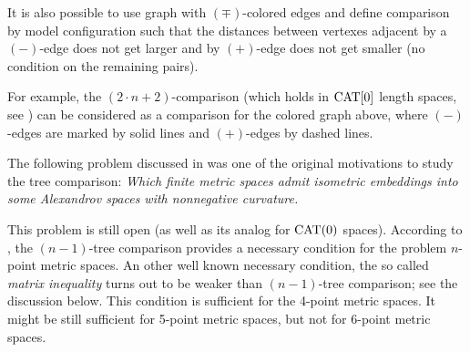 It is also possible to use graph with $(\mp)$-colored edges and define comparison by model configuration such that the distances between vertexes adjacent by a $(-)$-edge does not get larger and by $(+)$-edge does not get smaller (no condition on the remaining pairs).

\begin{center}
\end{center}

For example, the $(2{\cdot}n+2)$-comparison (which holds in $\mathop{\rm CAT}\nolimits[0]$ length spaces, see \cite{AKP}) can be considered as a comparison for the colored graph above, where $(-)$-edges are marked by solid lines and $(+)$-edges by dashed lines.


The following problem discussed in \cite[7.1]{AKP} was one of the original motivations to study the tree comparison:
\emph{Which finite metric spaces admit isometric embeddings into some Alexandrov spaces with nonnegative curvature.}


This problem is still open (as well as its analog for $\mathop{\rm CAT}\nolimits(0)$ spaces).
According to \cite[4.1]{AKP}, the $(n-1)$-tree comparison provides a necessary condition for the problem $n$-point metric spaces.
An other well known necessary condition, the so called \emph{matrix inequality} turns out to be weaker than $(n-1)$-tree comparison; see the discussion below.
This condition is sufficient for the 4-point metric spaces.
It might be still sufficient for 5-point metric spaces,
but not for 6-point metric spaces.

